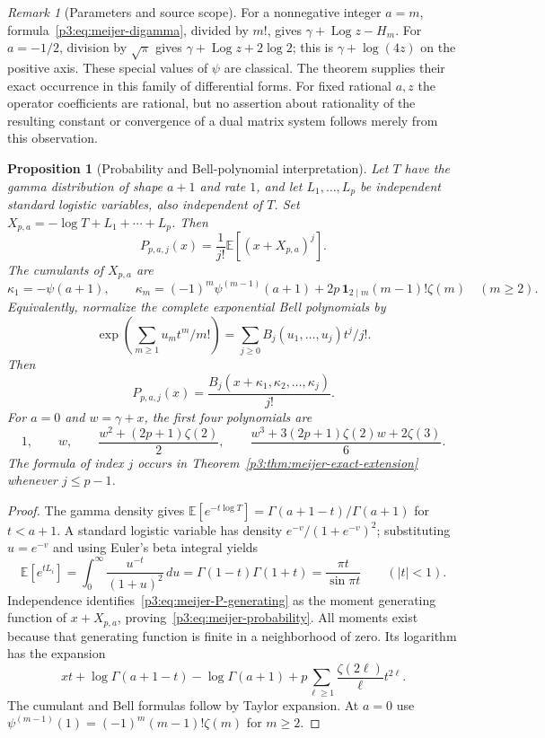 \documentclass[11pt,a4paper]{article}
\newtheorem{proposition}[theorem]{Proposition}
\theoremstyle{definition}
\theoremstyle{remark}
\newtheorem{remark}[theorem]{Remark}
\DeclareMathOperator{\Log}{Log}
\numberwithin{equation}{section}
\begin{document}
\begin{remark}[Parameters and source scope]
For a nonnegative integer $a=m$, formula~\eqref{p3:eq:meijer-digamma}, divided
by $m!$, gives $\gamma+\Log z-H_m$. For $a=-1/2$, division by $\sqrt\pi$
gives $\gamma+\Log z+2\log2$; this is $\gamma+\log(4z)$ on the positive
axis. These special values of $\psi$ are classical. The theorem supplies
their exact occurrence in this family of differential forms. For fixed
rational $a,z$ the operator coefficients are rational, but no assertion
about rationality of the resulting constant or convergence of a dual
matrix system follows merely from this observation.
\end{remark}

\begin{proposition}[Probability and Bell-polynomial interpretation]
\label{p3:prop:meijer-probability}
Let $T$ have the gamma distribution of shape $a+1$ and rate $1$, and let
$L_1,\ldots,L_p$ be independent standard logistic variables, also independent
of $T$. Set $X_{p,a}=-\log T+L_1+\cdots+L_p$. Then
\begin{equation}\label{p3:eq:meijer-probability}
 P_{p,a,j}(x)=\frac1{j!}\mathbb E[(x+X_{p,a})^j].
\end{equation}
The cumulants of $X_{p,a}$ are
\[
 \kappa_1=-\psi(a+1),\qquad
 \kappa_m=(-1)^m\psi^{(m-1)}(a+1)
       +2p\,\mathbf1_{2\mid m}(m-1)!\zeta(m)\quad(m\ge2).
\]
Equivalently, normalize the complete exponential Bell polynomials by
\[
 \exp\left(\sum_{m\ge1}u_mt^m/m!\right)
 =\sum_{j\ge0}B_j(u_1,\ldots,u_j)t^j/j!.
\]
Then
\[
 P_{p,a,j}(x)=\frac{B_j(x+\kappa_1,\kappa_2,\ldots,\kappa_j)}{j!}.
\]
For $a=0$ and $w=\gamma+x$, the first four polynomials are
\[
 1,\qquad w,\qquad
 \frac{w^2+(2p+1)\zeta(2)}2,\qquad
 \frac{w^3+3(2p+1)\zeta(2)w+2\zeta(3)}6.
\]
The formula of index $j$ occurs in
Theorem~\ref{p3:thm:meijer-exact-extension} whenever $j\le p-1$.
\end{proposition}

\begin{proof}
The gamma density gives
$\mathbb E[e^{-t\log T}]=\Gamma(a+1-t)/\Gamma(a+1)$ for $t<a+1$.
A standard logistic variable has density $e^{-v}/(1+e^{-v})^2$; substituting
$u=e^{-v}$ and using Euler's beta integral yields
\[
 \mathbb E[e^{tL_i}]
   =\int_0^\infty\frac{u^{-t}}{(1+u)^2}\,du
   =\Gamma(1-t)\Gamma(1+t)=\frac{\pi t}{\sin\pi t}
       \qquad(|t|<1).
\]
Independence identifies~\eqref{p3:eq:meijer-P-generating} as the moment
generating function of $x+X_{p,a}$, proving~\eqref{p3:eq:meijer-probability}.
All moments exist because that generating function is finite in a
neighborhood of zero. Its logarithm has the expansion
\[
 xt+\log\Gamma(a+1-t)-\log\Gamma(a+1)
       +p\sum_{\ell\ge1}\frac{\zeta(2\ell)}{\ell}t^{2\ell}.
\]
The cumulant and Bell formulas follow by Taylor expansion. At $a=0$ use
$\psi^{(m-1)}(1)=(-1)^m(m-1)!\zeta(m)$ for $m\ge2$.
\end{proof}
\end{document}
